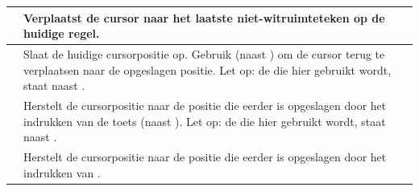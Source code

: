 \begin{center}
\begin{longtable}{c|L{5.5cm}}
\hline
{}  &
Verplaatst de cursor naar het laatste niet-witruimteteken op de huidige regel.\\
\hline
{} \megakeywhite{$\uparrow$} &
Slaat de huidige cursorpositie op. Gebruik  \megakeywhite{$\leftarrow$} (naast ) om de cursor terug te verplaatsen naar de opgeslagen positie. Let op: de \megakeywhite{$\uparrow$} die hier gebruikt wordt, staat naast .\\
\hline
{} \megakeywhite{$\leftarrow$} &
Herstelt de cursorpositie naar de positie die eerder is opgeslagen door het indrukken van de toets 
    \megakeywhite{$\uparrow$}
(naast ). Let op: de \megakeywhite{$\leftarrow$} die hier gebruikt wordt, staat naast .\\
\hline
{}  &
Herstelt de cursorpositie naar de positie die eerder is opgeslagen door het indrukken van .\\


\end{longtable}
\end{center}
